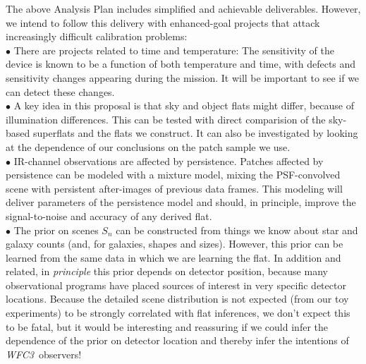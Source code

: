 \documentclass[12pt]{article}
\newcommand{\project}[1]{\textsl{#1}}
\newcommand{\WFC}{\project{WFC3}}
\begin{document}
The above Analysis Plan includes simplified and
achievable deliverables.
However, we intend to follow this delivery with enhanced-goal projects that
attack increasingly difficult calibration problems:
\\ $\bullet$
There are projects related to time and temperature: The sensitivity
of the device is known to be a function of both temperature and time,
with defects and sensitivity changes appearing during the mission.  It
will be important to see if we can detect these changes.
\\ $\bullet$
A key idea in this proposal is that sky and object flats might differ,
because of illumination differences.  This can be tested with direct
comparision of the sky-based superflats and the flats we construct.
It can also be investigated by looking at the dependence of our
conclusions on the patch sample we use.
\\ $\bullet$
IR-channel observations are affected by persistence.  Patches affected
by persistence can be modeled with a mixture model, mixing the
PSF-convolved scene with persistent after-images of previous data
frames.  This modeling will deliver parameters of the persistence
model and should, in principle, improve the signal-to-noise and
accuracy of any derived flat.
\\ $\bullet$
The prior on scenes $S_n$ can be constructed from things we know about
star and galaxy counts (and, for galaxies, shapes and sizes).
However, this prior can be learned from the same data in which we are
learning the flat.  In addition and related, in \emph{principle} this
prior depends on detector position, because many observational
programs have placed sources of interest in very specific detector
locations.  Because the detailed scene distribution is not expected
(from our toy experiments) to be strongly correlated with flat
inferences, we don't expect this to be fatal, but it would be
interesting and reassuring if we could infer the dependence of the
prior on detector location and thereby infer the intentions of
\WFC\ observers!

%
%
\budgetnarrative       %
\end{document}
